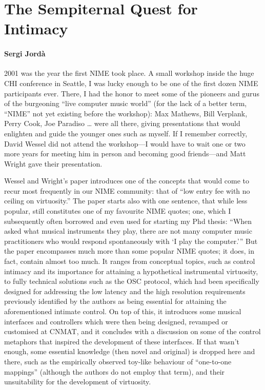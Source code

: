 \section*{The Sempiternal Quest for Intimacy}

\paragraph{Sergi Jord\`{a}}

2001 was the year the first NIME took place. A small workshop inside the huge CHI conference in Seattle, I was lucky enough to be one of the first dozen NIME participants ever. There, I had the honor to meet some of the pioneers and gurus of the burgeoning ``live computer music world'' (for the lack of a better term, ``NIME'' not yet existing before the workshop): Max Mathews, Bill Verplank, Perry Cook, Joe Paradiso … were all there, giving presentations that would enlighten and guide the younger ones such as myself. If I remember correctly, David Wessel did not attend the workshop---I would have to wait one or two more years for meeting him in person and becoming good friends---and Matt Wright gave their presentation.

Wessel and Wright's paper introduces one of the concepts that would come to recur most frequently in our NIME community: that of ``low entry fee with no ceiling on virtuosity.'' The paper starts also with one sentence, that while less popular, still constitutes one of my favourite NIME quotes; one, which I subsequently often borrowed and even used for starting my Phd thesis: ``When asked what musical instruments they play, there are not many computer music practitioners who would respond spontaneously with \lq I play the computer.\rq ''  But the paper encompasses much more than some popular NIME quotes; it does, in fact, contain almost too much. It ranges from conceptual topics, such as control intimacy and its importance for attaining a hypothetical instrumental virtuosity, to fully technical solutions such as the OSC protocol, which had been specifically designed for addressing the low latency and the high resolution requirements previously identified by the authors as being essential for attaining the aforementioned intimate control. On top of this, it introduces some musical interfaces and controllers which were then being designed, revamped or customised at CNMAT, and it concludes with a discussion on some of the control metaphors that inspired the development of these interfaces. If that wasn't enough, some essential knowledge (then novel and original) is dropped here and there, such as the empirically observed toy-like behaviour of ``one-to-one mappings'' (although the authors do not employ that term), and their unsuitability for the development of virtuosity.

